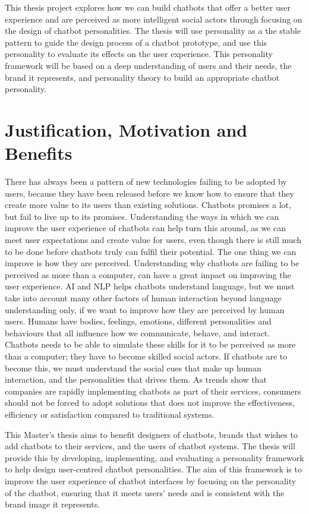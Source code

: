 This thesis project explores how we can build chatbots that offer a better user experience and are perceived as more intelligent social actors through focusing on the design of chatbot personalities. The thesis will use personality as a the stable pattern to guide the design process of a chatbot prototype, and use this personality to evaluate its effects on the user experience. This personality framework will be based on a deep understanding of users and their needs, the brand it represents, and personality theory to build an appropriate chatbot personality.

\vspace{5mm} %

\section{Justification, Motivation and Benefits}
There has always been a pattern of new technologies failing to be adopted by users, because they have been released before we know how to ensure that they create more value to its users than existing solutions. Chatbots promises a lot, but fail to live up to its promises. Understanding the ways in which we can improve the user experience of chatbots can help turn this around, as we can meet user expectations and create value for users, even though there is still much to be done before chatbots truly can fulfil their potential. The one thing we can improve is how they are perceived. Understanding why chatbots are failing to be perceived as more than a computer, can have a great impact on improving the user experience. AI and NLP helps chatbots understand language, but we must take into account many other factors of human interaction beyond language understanding only, if we want to improve how they are perceived by human users. Humans have bodies, feelings, emotions, different personalities and behaviours that all influence how we communicate, behave, and interact. Chatbots needs to be able to simulate these skills for it to be perceived as more than a computer; they have to become skilled social actors. If chatbots are to become this, we must understand the social cues that make up human interaction, and the personalities that drives them. As trends show that companies are rapidly implementing chatbots as part of their services, consumers should not be forced to adopt solutions that does not improve the effectiveness, efficiency or satisfaction compared to traditional systems.

This Master's thesis aims to benefit designers of chatbots, brands that wishes to add chatbots to their services, and the users of chatbot systems. The thesis will provide this by developing, implementing, and evaluating a personality framework to help design user-centred chatbot personalities. The aim of this framework is to improve the user experience of chatbot interfaces by focusing on the personality of the chatbot, ensuring that it meets users' needs and is consistent with the brand image it represents.


